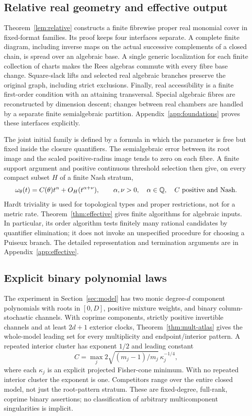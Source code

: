 \subsection*{Relative real geometry and effective output}
Theorem~\ref{lem:relative} constructs a finite fibrewise proper real
monomial cover in fixed-format families. Its proof keeps four interfaces
separate. A complete finite diagram, including inverse maps on the actual
successive complements of a closed chain, is spread over an algebraic
base. A single generic localization for each finite collection of charts
makes the Rees algebras commute with every fibre base change. Square-slack
lifts and selected real algebraic branches preserve the original graph,
including strict exclusions. Finally, real accessibility is a finite
first-order condition with an attaining transversal. Special algebraic
fibres are reconstructed by dimension descent; changes between real
chambers are handled by a separate finite semialgebraic partition.
Appendix~\ref{app:foundations} proves these interfaces explicitly.

The joint initial family is defined by a formula in which the parameter
is free but fixed inside the closure quantifiers. The semialgebraic error
between its root image and the scaled positive-radius image tends to zero
on each fibre. A finite support argument and positive continuous
threshold selection then give, on every compact subset $H$ of a finite
Nash stratum,
\[
 \omega_\theta(t)=C(\theta)t^\alpha+O_H(t^{\alpha+\nu}),\qquad
 \alpha,\nu>0,\quad \alpha\in\mathbb Q,\quad C\text{ positive and Nash}.
\]
Hardt triviality is used for topological types and proper restrictions,
not for a metric rate. Theorem~\ref{thm:effective} gives finite algorithms
for algebraic inputs. In particular, its order algorithm tests finitely
many rational candidates by quantifier elimination; it does not invoke an
unspecified procedure for choosing a Puiseux branch. The detailed
representation and termination arguments are in Appendix~\ref{app:effective}.

\subsection*{Explicit binary polynomial laws}
The experiment in Section~\ref{sec:model} has two monic degree-$d$
component polynomials with roots in $[0,D]$, positive mixture weights,
and binary column-stochastic channels. With coprime components, strictly
positive invertible channels and at least $2d+1$ exterior clocks,
Theorem~\ref{thm:mult-atlas} gives the whole-model leading set for every
multiplicity and endpoint/interior pattern. A repeated interior cluster
has exponent $1/2$ and leading constant
\[
 C=\max_j2\sqrt{(m_j-1)/m_j}\,\kappa_j^{-1/4},
\]
where each $\kappa_j$ is an explicit projected Fisher-cone minimum.
With no repeated interior cluster the exponent is one. Competitors
range over the entire closed model, not just the root-pattern stratum.
These are fixed-degree, full-rank, coprime binary assertions; no
classification of arbitrary multicomponent singularities is implicit.

